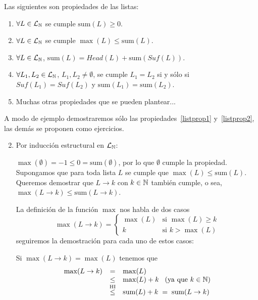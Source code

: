 \begin{teorema}
Las siguientes son propiedades de las listas:
\begin{enumerate}
\itemsep 0pt
\item $\forall L\in\mathcal{L}_{\mathbb{N}}$ se cumple $\text{sum}(L)\geq 0$.
\item $\forall L\in\mathcal{L}_{\mathbb{N}}$ se cumple $\max(L)\leq\text{sum}(L)$. \label{listprop1}
\item $\forall L\in\mathcal{L}_{\mathbb{N}}$, $\text{sum}(L)=Head(L)+\text{sum}(Suf(L))$.
\item $\forall L_1,L_2\in\mathcal{L}_{\mathbb{N}}$, $L_1,L_2\not=\emptyset$, se cumple $L_1=L_2$ si y sólo si $Suf(L_1)=Suf(L_2)$ y $\text{sum}(L_1)=\text{sum}(L_2)$. \label{listprop2}
\item Muchas otras propiedades que se pueden plantear...
\end{enumerate}
\begin{demostracion}
A modo de ejemplo demostraremos sólo las propiedades~\ref{listprop1} y~\ref{listprop2}, las demás se proponen como ejercicios.
\begin{enumerate}
	\setcounter{enumi}{1}
	\item Por inducción estructural en $\mathcal{L}_{\mathbb{N}}$:
	\begin{inducciondemo}
		\BI $\max(\emptyset)=-1\leq 0=\text{sum}(\emptyset)$, por lo que $\emptyset$ cumple la propiedad.
		\HI Supongamos que para toda lista $L$ se cumple que $\max(L)\leq\text{sum}(L)$.
		\TI Queremos demostrar que $L\rightarrow k$ con $k\in \mathbb{N}$ también cumple, o sea, $\max(L\rightarrow k)\leq\text{sum}(L\rightarrow k)$.
		
		La definición de la función $\max$ nos habla de dos casos
		\[
		\max(L\rightarrow k)=\left\{
		\begin{array}{cl}
		\max(L) & \text{si }\max(L)\geq k \\
		k & \text{si }k>\max(L)
		\end{array}\right.
		\]
		seguiremos la demostración para cada uno de estos casos:
		
		Si $\max(L\rightarrow k)=\max(L)$ tenemos que
		  \[
		  \begin{array}{rcl}
		  \max(L\rightarrow k) & = & \max(L) \\
		  & \leq & \max(L) + k \;\;\; \text{(ya que }k\in\mathbb{N}\text{)}\\
		  & \stackrel{\text{HI}}{\leq}& \text{sum}(L) + k \; =\; \text{sum}(L\rightarrow k)
		  \end{array}
		  \]
		

\end{inducciondemo}
\end{enumerate}
\end{demostracion}
\end{teorema}
